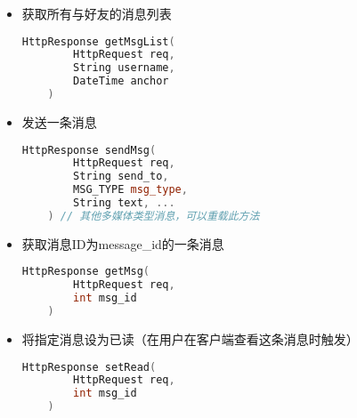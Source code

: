 {\begin{itemize}
    \item 获取所有与好友的消息列表
    \begin{lstlisting}[language=c++]
    HttpResponse getMsgList(
        HttpRequest req,
        String username,
        DateTime anchor
    )
    \end{lstlisting}

    \item 发送一条消息
    \begin{lstlisting}[language=c++]
    HttpResponse sendMsg(
        HttpRequest req,
        String send_to,
        MSG_TYPE msg_type,
        String text, ...
    ) // 其他多媒体类型消息，可以重载此方法
    \end{lstlisting}

    \item 获取消息ID为message\_id的一条消息
    \begin{lstlisting}[language=c++]
    HttpResponse getMsg(
        HttpRequest req,
        int msg_id
    )
    \end{lstlisting}

    \item 将指定消息设为已读（在用户在客户端查看这条消息时触发）
    \begin{lstlisting}[language=c++]
    HttpResponse setRead(
        HttpRequest req,
        int msg_id
    )
    \end{lstlisting}

\end{itemize}
}